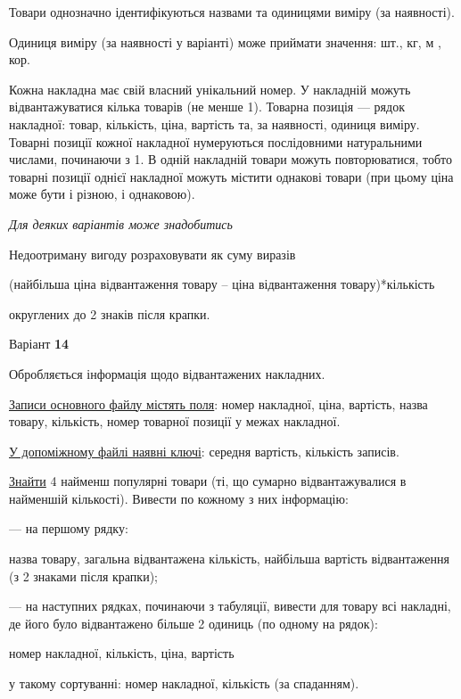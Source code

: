 \documentclass[11pt, ukrainian]{article}
\begin{document}
Товари однозначно ідентифікуються назвами та одиницями виміру (за наявності).

Одиниця виміру (за наявності у варіанті) може приймати значення: шт., кг, м , кор.

Кожна накладна має свій власний унікальний номер.
У накладній можуть відвантажуватися кілька товарів (не менше 1).
Товарна позиція --- рядок накладної: товар, кількість, ціна, вартість та, за наявності, одиниця виміру.
Товарні позиції кожної накладної нумеруються послідовними натуральними числами, починаючи з 1.
В одній накладній товари можуть повторюватися, 
тобто товарні позиції однієї накладної можуть містити однакові товари 
(при цьому ціна може бути і різною, і однаковою).

\bigskip\textit{Для деяких варіантів може знадобитись}

Недоотриману вигоду розраховувати як суму виразів
{\center (найбільша ціна відвантаження товару – ціна відвантаження товару)*кількість\par}

\bigskip
{\noindent} округлених до 2 знаків після крапки.


\par
\newpage
{\center Варіант  \No \textbf { 14 }\par}
\bigskip
Обробляється інформація щодо відвантажених накладних.

\underline{Записи основного файлу містять поля}: номер накладної, ціна, вартість, назва товару, кількість, номер товарної позиції у межах накладної.

\underline{У допоміжному файлі наявні ключі}: середня вартість, кількість записів.

\underline{Знайти} 4 найменш популярні товари (ті, що сумарно відвантажувалися в найменшій кількості). Вивести по кожному з них інформацію:\par
{\noindent}--- на першому рядку:\par
назва товару, загальна відвантажена кількість, найбільша вартість відвантаження (з 2 знаками після крапки);

{\noindent}--- на наступних рядках, починаючи з табуляції, вивести для товару всі накладні, де його було відвантажено більше 2 одиниць (по одному на рядок):\par
номер накладної, кількість, ціна, вартість

{\noindent}у такому сортуванні: номер накладної, кількість (за спаданням).

\end{document}
